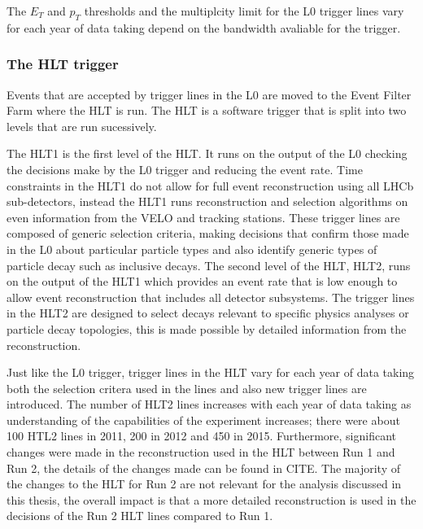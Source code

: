 The  $E_{T}$ and $p_{T}$ thresholds and the multiplcity limit for the L0 trigger lines vary for each year of data taking depend on the bandwidth avaliable for the trigger. %


\subsubsection{The HLT trigger}
\label{HLT}

Events that are accepted by trigger lines in the L0 are moved to the Event Filter Farm where the HLT is run. The HLT is a software trigger that is split into two levels that are run sucessively. 


The HLT1 is the first level of the HLT. It runs on the output of the L0 checking the decisions make by the L0 trigger and reducing the event rate. %
Time constraints in the HLT1 do not allow for full event reconstruction using all LHCb sub-detectors, instead the HLT1 runs reconstruction and selection algorithms on even information from the VELO and tracking stations. These trigger lines are composed of generic selection criteria, making decisions that confirm those made in the L0 about particular particle types and also identify generic types of particle decay such as inclusive \bhadron decays. The second level of the HLT, HLT2, runs on the output of the HLT1 which provides an event rate that is low enough to allow event reconstruction that includes all detector subsystems. The trigger lines in the HLT2 are designed to select decays relevant to specific physics analyses or particle decay topologies, this is made possible by detailed information from the reconstruction. 

Just like the L0 trigger, trigger lines in the HLT vary for each year of data taking both the selection critera used in the lines and also new trigger lines are introduced. The number of HLT2 lines increases with each year of data taking as understanding of the capabilities of the experiment increases; there were about 100 HTL2 lines in 2011, 200 in 2012 and 450 in 2015. Furthermore, significant changes were made in the reconstruction used in the HLT between Run 1 and Run 2,  the details of the changes made can be found in CITE. The majority of the changes to the HLT for Run 2 are not relevant for the analysis discussed in this thesis, the overall impact is that a more detailed reconstruction is used in the decisions of the Run 2 HLT lines compared to Run 1.



